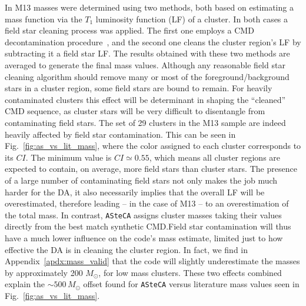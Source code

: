 \documentclass{aa}
\begin{document}
In M13 masses were determined using two methods, both based on estimating
a mass function via the $T_1$ luminosity function (LF) of a cluster.
In both cases a field star cleaning process was applied. The first one employs
a CMD decontamination procedure~\citep{Maia_2010}, and the
second one cleans the cluster region's LF by subtracting it a field star LF.\@
The results obtained with these two methods are averaged to generate the final
mass values.
%
Although any reasonable field star cleaning algorithm should remove many or most
of the foreground/background stars in a cluster region, some field stars are
bound to remain.
For heavily contaminated clusters this effect will be determinant in shaping the
``cleaned'' CMD sequence, as cluster stars will be very difficult to
disentangle from contaminating field stars.
%
The set of 29 clusters in the M13 sample are indeed heavily affected by field
star contamination. This can be seen in Fig.~\ref{fig:as_vs_lit_mass}, where the
color assigned to each cluster corresponds to its $CI$. The minimum value is
$CI{\simeq}0.55$, which means all cluster regions are expected to contain, on
average, more field stars than cluster stars.
%
The presence of a large number of contaminating field stars not only makes the
job much harder for the DA, it also necessarily implies that the overall LF will
be overestimated, therefore leading -- in the case of M13 --  to an
overestimation of the total mass.
In contrast, \texttt{ASteCA} assigns cluster masses taking their values directly
from the best match synthetic CMD.\@ Field star contamination will thus have
a much lower influence on the code's mass estimate, limited just to how
effective the DA is in cleaning the cluster region. In fact, we find in
Appendix~\ref{apdx:mass_valid} that the code will slightly underestimate the
masses by approximately 200 $M_{\odot}$, for low mass clusters.
These two effects combined explain the ${\sim}500\,M_{\odot}$ offset found
for \texttt{ASteCA} versus literature mass values seen in
Fig.~\ref{fig:as_vs_lit_mass}.
\end{document}
